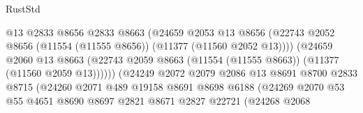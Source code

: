 \begin{lexlean}{RustStd}
\begin{coremodule}
                                          @13
                                          @2833
                                          @8656
                                          @2833
                                          @8663
                                          (@24659
                                            @2053
                                            @13
                                            @8656
                                            (@22743
                                              @2052
                                              @8656
                                              (@11554 (@11555 @8656))
                                              (@11377 (@11560 @2052 @13))))
                                          (@24659
                                            @2060
                                            @13
                                            @8663
                                            (@22743
                                              @2059
                                              @8663
                                              (@11554 (@11555 @8663))
                                              (@11377 (@11560 @2059 @13))))))
                                      (@24249
                                        @2072
                                        @2079
                                        @2086
                                        @13
                                        @8691
                                        @8700
                                        @2833
                                        @8715
                                        (@24260
                                          @2071
                                          @489
                                          @19158
                                          @8691
                                          @8698
                                          @6188
                                          (@24269
                                            @2070
                                            @53
                                            @55
                                            @4651
                                            @8690
                                            @8697
                                            @2821
                                            @8671
                                            @2827
                                            @22721
                                            (@24268
                                              @2068

\end{coremodule}
\end{lexlean}
